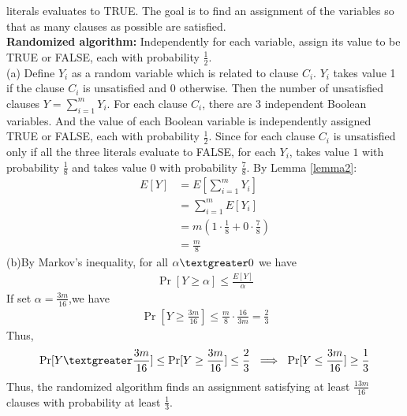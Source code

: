 literals evaluates to TRUE. The goal is to find an assignment of the variables so that as many clauses as possible are satisfied.\\
\textbf{Randomized algorithm:} Independently for each variable, assign its value to be TRUE or FALSE, each with probability $\frac{1}{2}$.\\
(a)
Define $Y_i$ as a random variable which is related to clause $C_i$. $Y_i$ takes value 1 if the clause $C_i$ is unsatisfied and 0 otherwise. Then the number of unsatisfied clauses $Y=\sum_{i=1}^{m}Y_i$. For each clause $C_i$, there are $3$ independent Boolean variables. And the value of each Boolean variable is independently assigned TRUE or FALSE, each with probability $\frac{1}{2}$. Since for each clause $C_i$ is unsatisfied only if all the three literals evaluate to FALSE, for each $Y_i$, takes value $1$ with probability $\frac{1}{8}$ and takes value $0$ with probability $\frac{7}{8}$. By Lemma \ref{lemma2}:
\begin{align}
    \nonumber E[Y]&=E[\sum_{i=1}^{m}Y_i]\\
    \nonumber&=\sum_{i=1}^mE[Y_i]\\
    \nonumber&=m(1\cdot \frac{1}{8}+0 \cdot \frac{7}{8})\\
    \nonumber&=\frac{m}{8}
\end{align}
(b)By Markov's inequality, for all $\alpha \textgreater 0$ we have
\begin{align}
   \nonumber \Pr[Y\ge \alpha]\le \frac{E[Y]}{\alpha}
\end{align}
If set $\alpha=\frac{3m}{16}$,we have
\begin{align}
    \nonumber \Pr[Y\ge \frac{3m}{16}]\le \frac{m}{8}\cdot \frac{16}{3m}=\frac{2}{3}
\end{align}
Thus, 
\begin{align}
    \nonumber \Pr[Y\textgreater \frac{3m}{16}] \le \Pr[Y\ge \frac{3m}{16}]\le \frac{2}{3} ~\implies~\Pr[Y\le \frac{3m}{16}]\ge \frac{1}{3}
\end{align}
Thus, the randomized algorithm finds an assignment satisfying at least $\frac{13m}{16}$ clauses with probability at least $\frac{1}{3}$.\\
